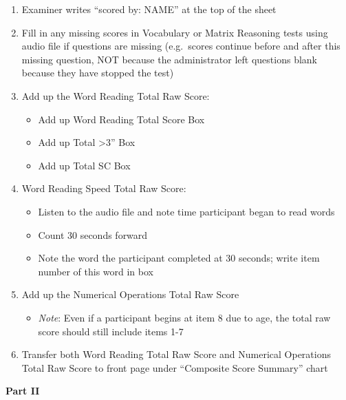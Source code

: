 \documentclass[
]{book}
\providecommand{\tightlist}{%
  \setlength{\itemsep}{0pt}\setlength{\parskip}{0pt}}
\begin{document}
\begin{enumerate}
\def\labelenumi{\arabic{enumi}.}
\tightlist
\item
  Examiner writes ``scored by: NAME'' at the top of the sheet
\item
  Fill in any missing scores in Vocabulary or Matrix Reasoning tests using audio file if questions are missing (e.g.~scores continue before and after this missing question, NOT because the administrator left questions blank because they have stopped the test)
\item
  Add up the Word Reading Total Raw Score:

  \begin{itemize}
  \tightlist
  \item
    Add up Word Reading Total Score Box
  \item
    Add up Total \textgreater3'' Box
  \item
    Add up Total SC Box
  \end{itemize}
\item
  Word Reading Speed Total Raw Score:

  \begin{itemize}
  \tightlist
  \item
    Listen to the audio file and note time participant began to read words
  \item
    Count 30 seconds forward
  \item
    Note the word the participant completed at 30 seconds; write item number of this word in box
  \end{itemize}
\item
  Add up the Numerical Operations Total Raw Score

  \begin{itemize}
  \tightlist
  \item
    \emph{Note}: Even if a participant begins at item 8 due to age, the total raw score should still include items 1-7
  \end{itemize}
\item
  Transfer both Word Reading Total Raw Score and Numerical Operations Total Raw Score to front page under ``Composite Score Summary'' chart
\end{enumerate}

\textbf{Part II}
\end{document}
